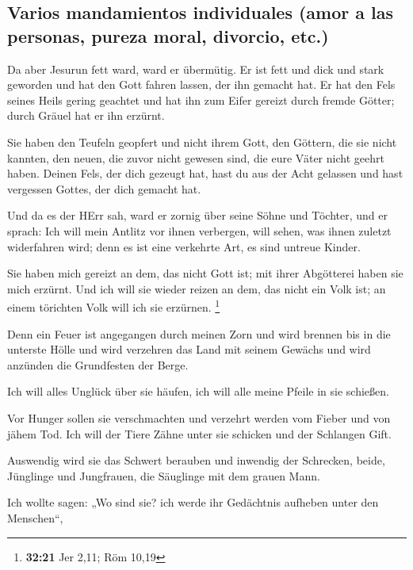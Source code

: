 \hypertarget{varios-mandamientos-individuales-amor-a-las-personas-pureza-moral-divorcio-etc.}{%
\subsection{Varios mandamientos individuales (amor a las personas,
pureza moral, divorcio,
etc.)}\label{varios-mandamientos-individuales-amor-a-las-personas-pureza-moral-divorcio-etc.}}

 Da aber Jesurun fett ward, ward er übermütig. Er ist
fett und dick und stark geworden und hat den Gott fahren lassen, der ihn
gemacht hat. Er hat den Fels seines Heils gering geachtet
 und hat ihn zum Eifer gereizt durch fremde Götter; durch
Gräuel hat er ihn erzürnt.

 Sie haben den Teufeln geopfert und nicht ihrem Gott, den
Göttern, die sie nicht kannten, den neuen, die zuvor nicht gewesen sind,
die eure Väter nicht geehrt haben.  Deinen Fels, der dich
gezeugt hat, hast du aus der Acht gelassen und hast vergessen Gottes,
der dich gemacht hat.

 Und da es der HErr sah, ward er zornig über seine Söhne
und Töchter,  und er sprach: Ich will mein Antlitz vor
ihnen verbergen, will sehen, was ihnen zuletzt widerfahren wird; denn es
ist eine verkehrte Art, es sind untreue Kinder.

 Sie haben mich gereizt an dem, das nicht Gott ist; mit
ihrer Abgötterei haben sie mich erzürnt. Und ich will sie wieder reizen
an dem, das nicht ein Volk ist; an einem törichten Volk will ich sie
erzürnen. \footnote{\textbf{32:21} Jer 2,11; Röm 10,19}

 Denn ein Feuer ist angegangen durch meinen Zorn und wird
brennen bis in die unterste Hölle und wird verzehren das Land mit seinem
Gewächs und wird anzünden die Grundfesten der Berge.

 Ich will alles Unglück über sie häufen, ich will alle
meine Pfeile in sie schießen.

 Vor Hunger sollen sie verschmachten und verzehrt werden
vom Fieber und von jähem Tod. Ich will der Tiere Zähne unter sie
schicken und der Schlangen Gift.

 Auswendig wird sie das Schwert berauben und inwendig der
Schrecken, beide, Jünglinge und Jungfrauen, die Säuglinge mit dem grauen
Mann.

 Ich wollte sagen: „Wo sind sie? ich werde ihr Gedächtnis
aufheben unter den Menschen``,

